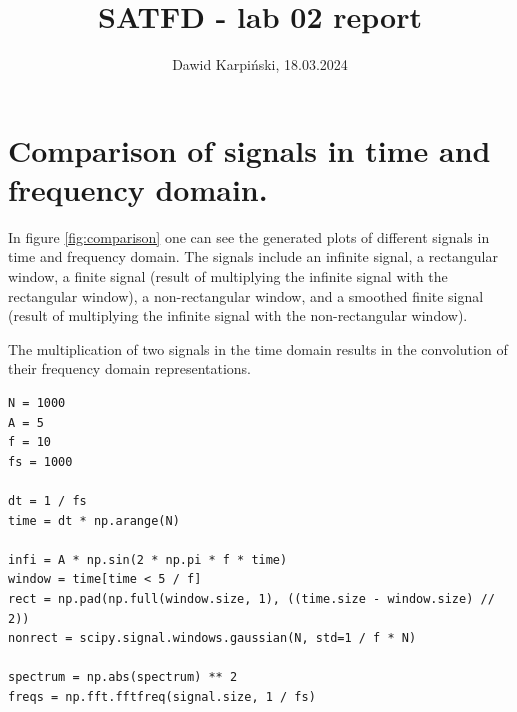\documentclass[13pt,a4paper]{article}
\begin{document}
\title{
    \LARGE
    \textbf{SATFD - lab 02 report}
}
\author{
    \large
    Dawid Karpiński, 18.03.2024
}
\date{}
\maketitle

\section{Comparison of signals in time and frequency domain.}

In figure \ref{fig:comparison} one can see the generated plots of different signals in time and frequency domain. The signals include an infinite signal, a rectangular window, a finite signal (result of multiplying the infinite signal with the rectangular window), a non-rectangular window, and a smoothed finite signal (result of multiplying the infinite signal with the non-rectangular window).

The multiplication of two signals in the time domain results in the convolution of their frequency domain representations.

\begin{lstlisting}[caption={\textbf{Code snippet for generating the signals.}}]
N = 1000
A = 5
f = 10
fs = 1000

dt = 1 / fs
time = dt * np.arange(N)

infi = A * np.sin(2 * np.pi * f * time)
window = time[time < 5 / f]
rect = np.pad(np.full(window.size, 1), ((time.size - window.size) // 2))
nonrect = scipy.signal.windows.gaussian(N, std=1 / f * N)

spectrum = np.abs(spectrum) ** 2
freqs = np.fft.fftfreq(signal.size, 1 / fs)
\end{lstlisting}
\end{document}
